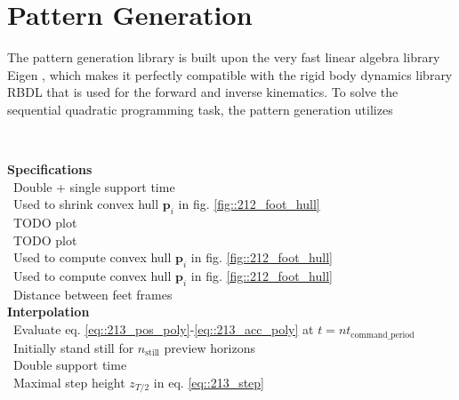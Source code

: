 \section{Pattern Generation}
\label{sec::32_pg}
The pattern generation library is built upon the very fast linear algebra library Eigen \cite{eigenweb}, which makes it perfectly compatible with the rigid body dynamics library RBDL \cite{felis2017rbdl} that is used for the forward and inverse kinematics. To solve the sequential quadratic programming task, the pattern generation utilizes 
\cite{ferreau2014qpoases} %

\cite{googletest} %
\\
\begin{minipage}[t]{1.\textwidth}
	\begin{minipage}{0.5\textwidth}
		\scriptsize{
			\hfill \textbf{Specifications}\\
			\mbox{}~\hfill Double + single support time\\
			\mbox{}~\hfill Used to shrink convex hull $\bm{p}_i$ in fig.  \ref{fig::212_foot_hull}\\
			\mbox{}~\hfill TODO plot\\
			\mbox{}~\hfill TODO plot\\
			\mbox{}~\hfill Used to compute convex hull $\bm{p}_i$ in fig.  \ref{fig::212_foot_hull}\\
			\mbox{}~\hfill Used to compute convex hull $\bm{p}_i$ in fig.  \ref{fig::212_foot_hull}\\
			\mbox{}~\hfill Distance between feet frames\\
			
			\hfill \textbf{Interpolation}\\
			\mbox{}~\hfill Evaluate eq. \ref{eq::213_pos_poly}-\ref{eq::213_acc_poly} at $t=nt_\text{command\_period}$\\
			\mbox{}~\hfill Initially stand still for $n_\text{still}$ preview horizons\\
			\mbox{}~\hfill Double support time\\
			\mbox{}~\hfill Maximal step height $z_{T/2}$ in eq. \ref{eq::213_step}\\
			
}
\end{minipage}
\end{minipage}
